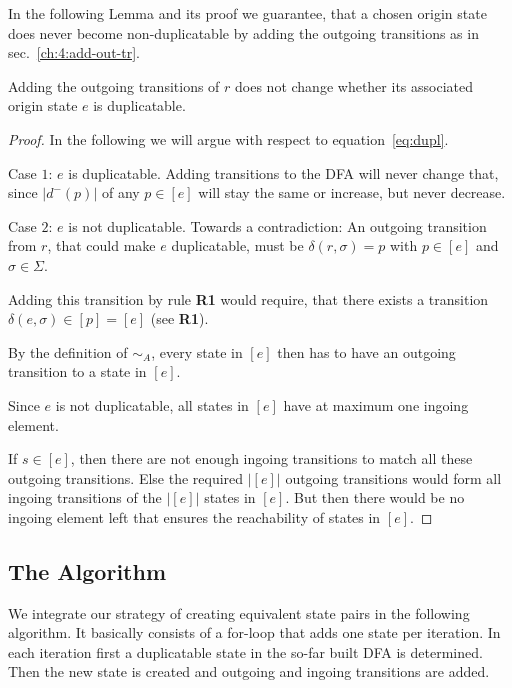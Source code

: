 In the following Lemma and its proof we guarantee, that a chosen origin state does never become non-duplicatable by adding the outgoing transitions as in sec.~\ref{ch:4:add-out-tr}.
\begin{lemma}
	Adding the outgoing transitions of $r$ does not change whether its associated origin state $e$ is duplicatable.
\end{lemma}
\begin{proof}
In the following we will argue with respect to equation~\ref{eq:dupl}.
\vspace{0.1cm}
	
\noindent Case $1$: $e$ is duplicatable. Adding transitions to the DFA will never change that, since $|d^-(p)|$ of any $p\in[e]$ will stay the same or increase, but never decrease.\par
\vspace{0.1cm}
	
\noindent Case $2$: $e$ is not duplicatable. Towards a contradiction: An outgoing transition from $r$, that could make $e$ duplicatable, must be $\delta(r, \sigma) = p$ with $p\in[e]$ and $\sigma\in\Sigma$.
	
Adding this transition by rule \textbf{R1} would require, that there exists a transition $\delta(e, \sigma) \in [p] = [e]$ (see \textbf{R1}).
	
By the definition of $\sim_A$, every state in $[e]$ then has to have an outgoing transition to a state in $[e]$.
	
Since $e$ is not duplicatable, all states in $[e]$ have at maximum one ingoing element.
\vspace{0.1cm}

\noindent If $s \in [e]$, then there are not enough ingoing transitions to match all these outgoing transitions. Else the required $|[e]|$ outgoing transitions would form all ingoing transitions of the $|[e]|$ states in $[e]$. But then there would be no ingoing element left that ensures the reachability of states in $[e]$.
\end{proof}

\subsection{The Algorithm}

We integrate our strategy of creating equivalent state pairs in the following algorithm. It basically consists of a for-loop that adds one state per iteration. In each iteration first a duplicatable state in the so-far built DFA is determined. Then the new state is created and outgoing and ingoing transitions are added.


